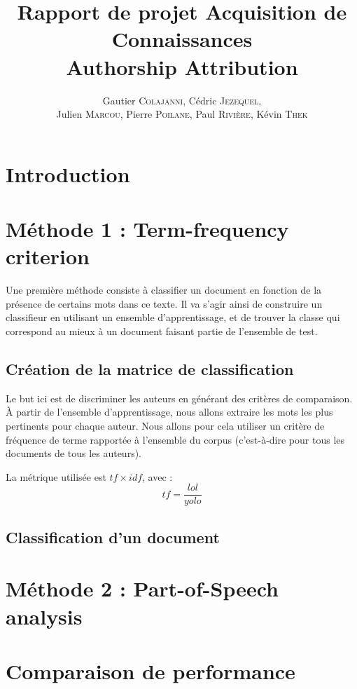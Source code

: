 \documentclass[a4paper]{article}
\author{Gautier \textsc{Colajanni}, Cédric \textsc{Jezequel},\\ Julien \textsc{Marcou}, Pierre \textsc{Poilane}, Paul \textsc{Rivière}, Kévin \textsc{Thek}}
\title{Rapport de projet Acquisition de Connaissances \\ Authorship Attribution}
\begin{document}
\maketitle

\section{Introduction}

\section{Méthode 1 : Term-frequency criterion}
Une première méthode consiste à classifier un document en fonction de la présence de certains mots dans ce texte. Il va s'agir ainsi de construire un classifieur en utilisant un ensemble d'apprentissage, et de trouver la classe qui correspond au mieux à un document faisant partie de l'ensemble de test.

\subsection{Création de la matrice de classification}
Le but ici est de discriminer les auteurs en générant des critères de comparaison. À partir de l'ensemble d'apprentissage, nous allons extraire les mots les plus pertinents pour chaque auteur. Nous allons pour cela utiliser un critère de fréquence de terme rapportée à l'ensemble du corpus (c'est-à-dire pour tous les documents de tous les auteurs).

La métrique utilisée est $tf \times idf$, avec : \[tf = \frac{lol}{yolo}\]

\subsection{Classification d'un document}

\section{Méthode 2 : Part-of-Speech analysis}

\section{Comparaison de performance}
\end{document}
